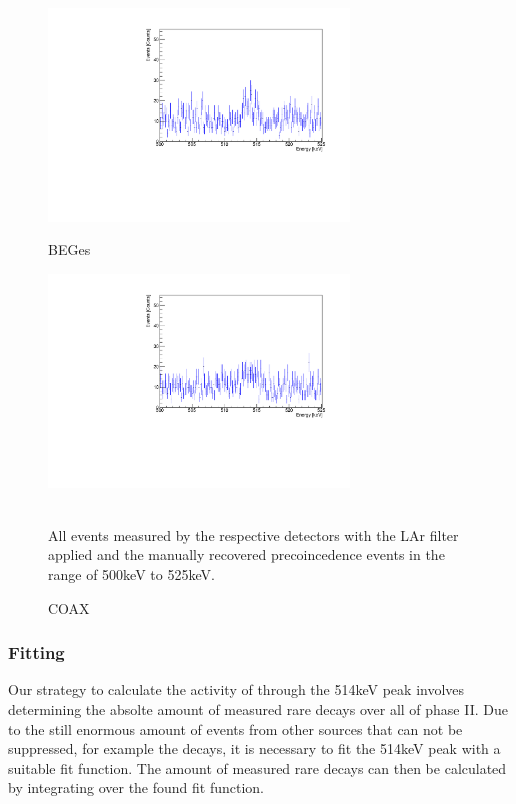 \begin{figure}[t!]
\centering
\begin{minipage}{.5\textwidth}
  \centering
	\includegraphics[width=80mm]{./Bilder/500525LArVetoBEGesEventList.pdf}
    \caption{BEGes}
  \label{fig:LArBEGesEV}
\end{minipage}%
\begin{minipage}{.5\textwidth}
  \centering
	\includegraphics[width=80mm]{./Bilder/500525LArVetoCOAXEventList.pdf}
  \caption{COAX}
  \label{fig:LArCOAXEV}
\end{minipage}
    \\
	\vspace{0.5cm}
    All events measured by the respective detectors with the LAr filter applied and the manually recovered precoincedence events in the range of 500keV to 525keV.
\end{figure}

\subsubsection{Fitting}
\label{sec:Fitting}

Our strategy to calculate the activity of  through the 514keV peak involves determining the absolte amount of measured rare  decays over all of phase II.
Due to the still enormous amount of events from other sources that can not be suppressed, for example the  decays, it is necessary to fit the 514keV peak with a suitable fit function.
The amount of measured rare  decays can then be calculated by integrating over the found fit function.
\\

